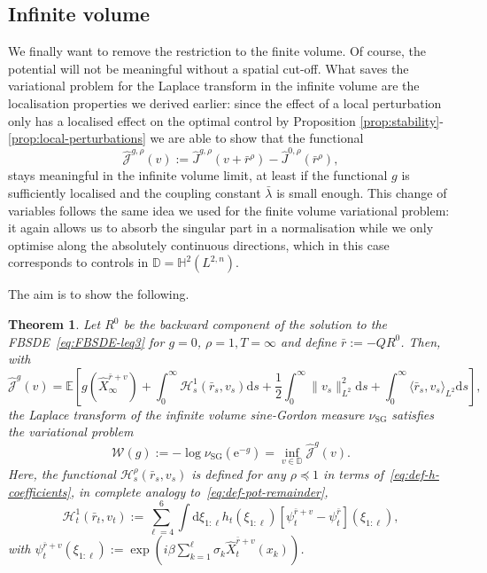 \documentclass[11pt, a4paper]{scrartcl}
\numberwithin{equation}{section}
\theoremstyle{plain}
\newtheorem{theorem}[foo]{Theorem}
\theoremstyle{remark}
\newcommand{\assign}{:=}
\newcommand{\mathd}{\mathrm{d}}
\newcommand{\mathe}{\mathrm{e}}
\newcommand{\tmop}[1]{\ensuremath{\operatorname{#1}}}
\begin{document}
\subsection{Infinite volume}

We finally want to remove the restriction to the finite volume. Of course, the
potential will not be meaningful without a spatial cut-off. What saves the
variational problem for the Laplace transform in the infinite volume are the
localisation properties we derived earlier: since the effect of a local
perturbation only has a localised effect on the optimal control by Proposition
\ref{prop:stability}-\ref{prop:local-perturbations} we are able to show that
the functional
\[ \hat{\mathcal{J}}^{g, \rho} (v) \assign \hat{J}^{g, \rho} (v +
	\bar{r}^{\rho}) - \hat{J}^{0, \rho} (\bar{r}^{\rho}), \]
stays meaningful in the infinite volume limit, at least if the functional $g$
is sufficiently localised and the coupling constant $\bar{\lambda}$ is small enough.
This change of variables follows the same idea we used for the finite volume
variational problem: it again allows us to absorb the singular part in a
normalisation while we only optimise along the absolutely continuous directions,
which in this case corresponds to controls in $\mathbb{D}=\mathbb{H}^2 (L^{2,
			n})$.

The aim is to show the following.

\begin{theorem}
	\label{thm:infinite-vol-var}Let $R^0$ be the backward component of the
	solution to the FBSDE~\eqref{eq:FBSDE-leq3} for $g = 0$, $\rho = 1, T =
		\infty$ and define $\bar{r} \assign -QR^0$. Then, with
	\[ \hat{\mathcal{J}}^g (v) =\mathbb{E} \left[ g (\hat{X}_{\infty}^{\bar{r} +
					v}) + \int_0^{\infty} \mathcal{H}_s^1 (\bar{r}_s, v_s) \mathd s +
			\frac{1}{2} \int_0^{\infty} \| v_s \|^2_{L^2} \mathd s + \int_0^{\infty}
			\langle \bar{r}_s, v_s \rangle_{L^2} \mathd s \right], \]
	the Laplace transform of the infinite volume sine-Gordon measure
	$\nu_{\tmop{SG}}$ satisfies the variational problem
	\[ \mathcal{W} (g) \assign - \log \nu_{\tmop{SG}} (\mathe^{- g}) = \inf_{v
			\in \mathbb{D}}  \hat{\mathcal{J}}^g (v) . \]
	Here, the functional $\mathcal{H}_s^{\rho} (\bar{r}_s, v_s)$ is defined for
	any $\rho \preceq  1$ in terms of~\eqref{eq:def-h-coefficients}, in
	complete analogy to~\eqref{eq:def-pot-remainder},
	\[ \mathcal{H}_t^1 (\bar{r}_t, v_t) \assign \sum_{\ell = 4}^6 \int \mathd
		\xi_{1 : \ell} h_t (\xi_{1 : \ell}) [\psi^{\bar{r} + v}_t -
				\psi^{\bar{r}}_t] (\xi_{1 : \ell}), \]
	with $\psi^{\bar{r} + v}_t (\xi_{1 : \ell}) \assign \exp \left( i \beta
		\sum_{k = 1}^{\ell} \sigma_k  \hat{X}_t^{\bar{r} + v} (x_k) \right)$.
\end{theorem}
\end{document}
